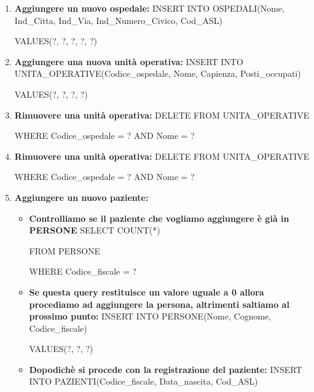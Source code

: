 \documentclass[a4paper,12pt]{report}
\begin{document}
\begin{enumerate}[leftmargin=0cm,itemindent=.5cm,labelwidth=\itemindent,labelsep=0cm,align=left]
    \item \textbf{Aggiungere un nuovo ospedale:} \newline
    INSERT INTO OSPEDALI(Nome, Ind\_Citta, Ind\_Via, Ind\_Numero\_Civico, Cod\_ASL) 

    VALUES(?, ?, ?, ?, ?)

    \item \textbf{Aggiungere una nuova unità operativa:} \newline
    INSERT INTO UNITA\_OPERATIVE(Codice\_ospedale, Nome, Capienza, Posti\_occupati)

    VALUES(?, ?, ?, ?)

    \item \textbf{Rimuovere una unità operativa:} \newline
    DELETE FROM UNITA\_OPERATIVE

    WHERE Codice\_ospedale = ? AND Nome = ?

    \item \textbf{Rimuovere una unità operativa:} \newline
    DELETE FROM UNITA\_OPERATIVE

    WHERE Codice\_ospedale = ? AND Nome = ?

    \item \textbf{Aggiungere un nuovo paziente:} 
    \begin{itemize}
        \item \textbf{Controlliamo se il paziente che vogliamo aggiungere è già in PERSONE} \newline
        SELECT COUNT(*)

        FROM PERSONE

        WHERE Codice\_fiscale = ?

        \item \textbf{Se questa query restituisce un valore uguale a 0 allora procediamo ad aggiungere la persona, 
        altrimenti saltiamo al prossimo punto:} \newline
        INSERT INTO PERSONE(Nome, Cognome, Codice\_fiscale)

        VALUES(?, ?, ?)

        \item \textbf{Dopodichè si procede con la registrazione del paziente:} \newline
        INSERT INTO PAZIENTI(Codice\_fiscale, Data\_nascita, Cod\_ASL)


\end{itemize}
\end{enumerate}
\end{document}

